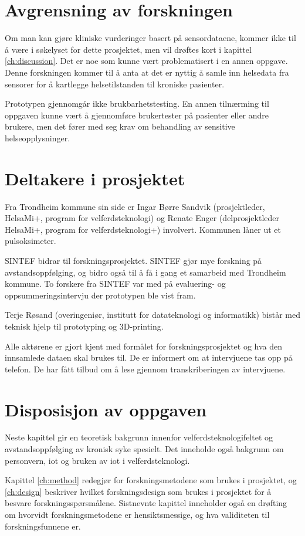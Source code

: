 \section{Avgrensning av forskningen}
Om man kan gjøre kliniske vurderinger basert på sensordataene, kommer ikke til å være i søkelyset for dette prosjektet,
men vil drøftes kort i kapittel \ref{ch:discussion}. Det er noe som kunne vært problematisert i en annen oppgave.
Denne forskningen kommer til å anta at det er nyttig å samle inn helsedata fra sensorer for å kartlegge helsetilstanden til kroniske pasienter.

Prototypen gjennomgår ikke brukbarhetstesting. En annen tilnærming til oppgaven kunne vært å gjennomføre brukertester på pasienter eller andre brukere, men det
fører med seg krav om behandling av sensitive helseopplysninger. %

\section{Deltakere i prosjektet}
Fra Trondheim kommune sin side er Ingar Børre Sandvik (prosjektleder, HelsaMi+, program for velferdsteknologi) og Renate Enger
(delprosjektleder HelsaMi+, program for velferdsteknologi+) involvert. Kommunen låner ut et pulsoksimeter.

SINTEF bidrar til forskningsprosjektet. SINTEF gjør mye forskning på
avstandsoppfølging, og bidro også til å få i gang et samarbeid med Trondheim kommune.
To forskere fra SINTEF var med på evaluering- og oppsummeringsintervju der prototypen
ble vist fram.

Terje Røsand (overingeniør, institutt for datateknologi og informatikk) bistår med teknisk hjelp til prototyping og 3D-printing.

Alle aktørene er gjort kjent med formålet for forskningsprosjektet og hva den innsamlede dataen skal brukes til. De er informert om at
intervjuene tas opp på telefon. De har fått tilbud om å lese gjennom transkriberingen av intervjuene.

\section{Disposisjon av oppgaven}
Neste kapittel gir en teoretisk bakgrunn innenfor velferdsteknologifeltet og avstandsoppfølging av kronisk syke spesielt.
Det inneholde også bakgrunn om personvern, \gls{iot} og bruken av \gls{iot} i velferdsteknologi.

Kapittel \ref{ch:method} redegjør for forskningsmetodene som brukes i prosjektet, og \ref{ch:design} beskriver hvilket forskningsdesign som brukes i prosjektet for å besvare forskningsspørsmålene.
Sistnevnte kapittel inneholder også en drøfting om hvorvidt forskningsmetodene er hensiktsmessige, og hva validiteten til forskningsfunnene er.

